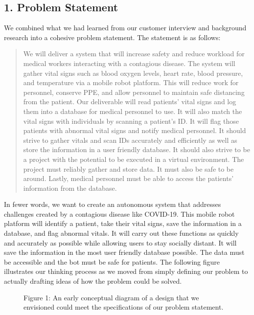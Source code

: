 ﻿\documentclass[10pt]{article}
\begin{document}
\subsection{1. Problem Statement}
We combined what we had learned from our customer interview and background research into a cohesive problem statement. The statement is as follows:
\begin{quote}        
We will deliver a system that will increase safety and reduce workload for medical workers interacting with a contagious disease. The system will gather vital signs such as blood oxygen levels, heart rate, blood pressure, and temperature via a mobile robot platform. This will reduce work for personnel, conserve PPE, and allow personnel to maintain safe distancing from the patient. Our deliverable will read patients’ vital signs and log them into a database for medical personnel to use. It will also match the vital signs with individuals by scanning a patient’s ID. It will flag those patients with abnormal vital signs and notify medical personnel. It should strive to gather vitals and scan IDs accurately and efficiently as well as store the information in a user friendly database. It should also strive to be a project with the potential to be executed in a virtual environment. The project must reliably gather and store data. It must also be safe to be around. Lastly, medical personnel must be able to access the patients’ information from the database. 
\end{quote}

In fewer words, we want to create an autonomous system that addresses challenges created by a contagious disease like COVID-19. This mobile robot platform will identify a patient, take their vital signs, save the information in a database, and flag abnormal vitals. It will carry out these functions as quickly and accurately as possible while allowing users to stay socially distant. It will save the information in the most user friendly database possible. The data must be accessible and the bot must be safe for patients. The following figure illustrates our thinking process as we moved from simply defining our problem to actually drafting ideas of how the problem could be solved.
  
\begin{figure}
\caption{Figure 1: An early conceptual diagram of a design that we envisioned could meet the specifications of our problem statement.}
\label{fig:1}
\end{figure}
\end{document}
